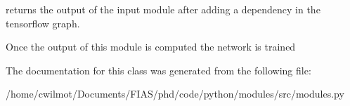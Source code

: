 returns the output of the input module after adding a dependency in the tensorflow graph. 

Once the output of this module is computed the network is trained 

The documentation for this class was generated from the following file\+:\begin{DoxyCompactItemize}
\item 
/home/cwilmot/\+Documents/\+F\+I\+A\+S/phd/code/python/modules/src/modules.\+py\end{DoxyCompactItemize}
